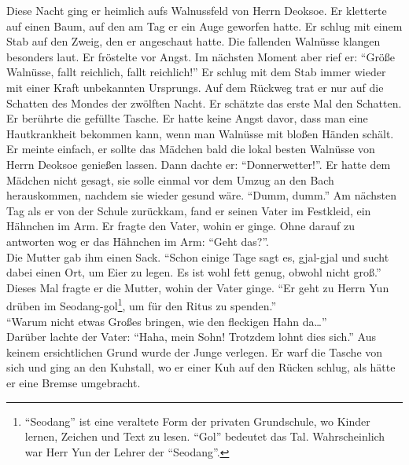 \documentclass[prd,12pt,tightenlines,notitlepage,nofootinbib]{revtex4-1}
\begin{document}
Diese Nacht ging er heimlich aufs Walnussfeld von Herrn Deoksoe.
Er kletterte auf einen Baum, auf den am Tag er ein Auge geworfen hatte.
Er schlug mit einem Stab auf den Zweig, den er angeschaut hatte.
Die fallenden Walnüsse klangen besonders laut.
Er fröstelte vor Angst.
Im nächsten Moment aber rief er: "`Größe Walnüsse, fallt reichlich, fallt reichlich!"'
Er schlug mit dem Stab immer wieder mit einer Kraft unbekannten Ursprungs.
Auf dem Rückweg trat er nur auf die Schatten des Mondes der zwölften Nacht.
Er schätzte das erste Mal den Schatten.
Er berührte die gefüllte Tasche.
Er hatte keine Angst davor, dass
man eine Hautkrankheit bekommen kann, wenn
man Walnüsse mit bloßen Händen schält.
Er meinte einfach,
er sollte das Mädchen bald die lokal besten Walnüsse von Herrn Deoksoe
genießen lassen.
Dann dachte er: "`Donnerwetter!"'.
Er hatte dem Mädchen nicht gesagt,
sie solle einmal vor dem Umzug an den Bach herauskommen,
nachdem sie wieder gesund wäre.
"`Dumm, dumm."'
Am nächsten Tag als er von der Schule zurückkam,
fand er seinen Vater im Festkleid, ein Hähnchen im Arm. %
Er fragte den Vater, wohin er ginge.
Ohne darauf zu antworten wog er das Hähnchen im Arm:
"`Geht das?"'.
\\ Die Mutter gab ihm einen Sack.
"`Schon einige Tage sagt es, gjal-gjal
und sucht dabei einen Ort, um Eier zu legen.
Es ist wohl fett genug, obwohl nicht groß."'
Dieses Mal fragte er die Mutter, wohin der Vater ginge.
"`Er geht zu Herrn Yun drüben im Seodang-gol\footnote{
"`Seodang"' ist eine veraltete Form der privaten Grundschule,
wo Kinder lernen,
Zeichen und Text zu lesen.
"`Gol"' bedeutet das Tal.
Wahrscheinlich war Herr Yun der Lehrer der "`Seodang"'.},
um für den Ritus zu spenden."'
\\ "`Warum nicht etwas Großes bringen, wie den fleckigen Hahn da\ldots"'
\\ Darüber lachte der Vater: "`Haha, mein Sohn!
Trotzdem lohnt dies sich."'
Aus keinem ersichtlichen Grund wurde der Junge verlegen.
Er warf die Tasche von sich und ging an den Kuhstall,
wo er einer Kuh auf den Rücken schlug,
als hätte er eine Bremse umgebracht.
\end{document}
